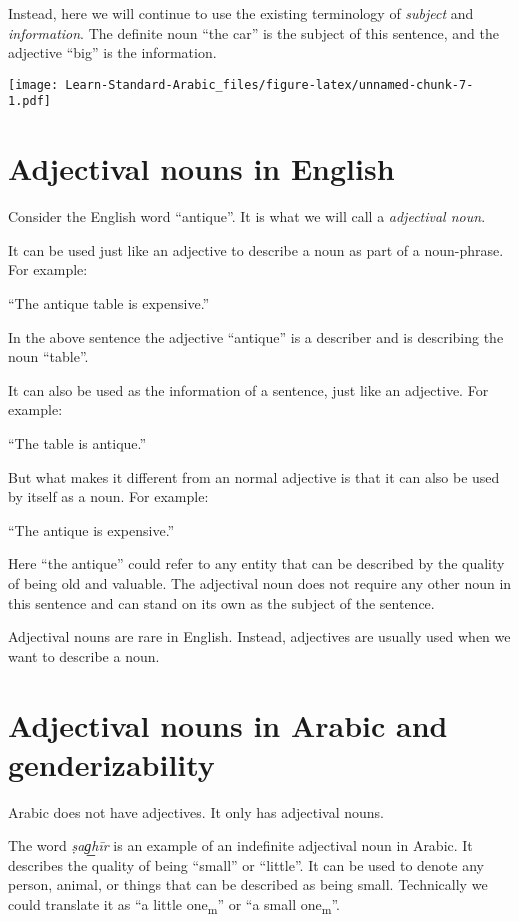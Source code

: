 \documentclass[
  10pt,
]{book}
\renewcommand{\foreignlanguage}[2]{\oldforeignlanguage{#1}{\smash{#2}}}
\begin{document}
Instead, here we will continue to use the existing terminology of \emph{subject} and \emph{information}. The definite noun \enquote{the car} is the subject of this sentence, and the adjective \enquote{big} is the information.

\texttt{[image: Learn-Standard-Arabic\_files/figure-latex/unnamed-chunk-7-1.pdf]}

\section{Adjectival nouns in English}\label{adjectival-nouns-in-english}

Consider the English word \enquote{antique}. It is what we will call a \emph{adjectival noun}.

It can be used just like an adjective to describe a noun as part of a noun-phrase. For example:

\enquote{The antique table is expensive.}

In the above sentence the adjective \enquote{antique} is a describer and is describing the noun \enquote{table}.

It can also be used as the information of a sentence, just like an adjective. For example:

\enquote{The table is antique.}

But what makes it different from an normal adjective is that it can also be used by itself as a noun. For example:

\enquote{The antique is expensive.}

Here \enquote{the antique} could refer to any entity that can be described by the quality of being old and valuable. The adjectival noun does not require any other noun in this sentence and can stand on its own as the subject of the sentence.

Adjectival nouns are rare in English. Instead, adjectives are usually used when we want to describe a noun.

\section{Adjectival nouns in Arabic and genderizability}\label{adjectival-nouns-in-arabic-and-genderizability}

Arabic does not have adjectives. It only has adjectival nouns.

The word \foreignlanguage{arabic}{صَغِير} \emph{ṣag͟hīr} is an example of an indefinite adjectival noun in Arabic. It describes the quality of being \enquote{small} or \enquote{little}. It can be used to denote any person, animal, or things that can be described as being small. Technically we could translate it as \enquote{a little one\textsubscript{m}} or \enquote{a small one\textsubscript{m}}.
\end{document}
